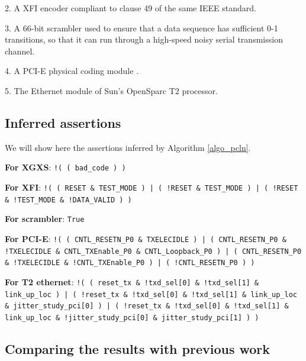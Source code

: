 \documentclass[journal]{IEEEtran}
\begin{document}
2. A XFI encoder compliant to clause 49 of the same IEEE standard.

3. A 66-bit scrambler used to ensure
that a data sequence has sufficient 0-1 transitions,
so that it can run through a high-speed
noisy serial transmission channel.

4. A PCI-E physical coding module \cite{PCIESPEC}.

5. The Ethernet module of Sun's OpenSparc T2 processor.

\subsection{Inferred assertions}
We will show here the assertions inferred by Algorithm \ref{algo_pcln}.

\textbf{For XGXS}:
\texttt{!( ( bad\_code ) )}

\textbf{For XFI}:
\texttt{!( ( RESET \& TEST\_MODE ) | ( !RESET \& TEST\_MODE ) | ( !RESET \& !TEST\_MODE \& !DATA\_VALID ) )}

\textbf{For scrambler}:
\texttt{True}

\textbf{For PCI-E}:
\texttt{!( ( CNTL\_RESETN\_P0 \& TXELECIDLE ) | ( CNTL\_RESETN\_P0 \& !TXELECIDLE \& CNTL\_TXEnable\_P0 \& CNTL\_Loopback\_P0 ) | ( CNTL\_RESETN\_P0 \& !TXELECIDLE \& !CNTL\_TXEnable\_P0 ) | ( !CNTL\_RESETN\_P0 ) )}

\textbf{For T2 ethernet}:
\texttt{!( ( reset\_tx \& !txd\_sel[0] \& !txd\_sel[1] \& link\_up\_loc ) | ( !reset\_tx \& !txd\_sel[0] \& !txd\_sel[1] \& link\_up\_loc \& jitter\_study\_pci[0] ) | ( !reset\_tx \& !txd\_sel[0] \& !txd\_sel[1] \& link\_up\_loc \& !jitter\_study\_pci[0] \& jitter\_study\_pci[1] ) )}

\subsection{Comparing the results with previous work}
\end{document}
